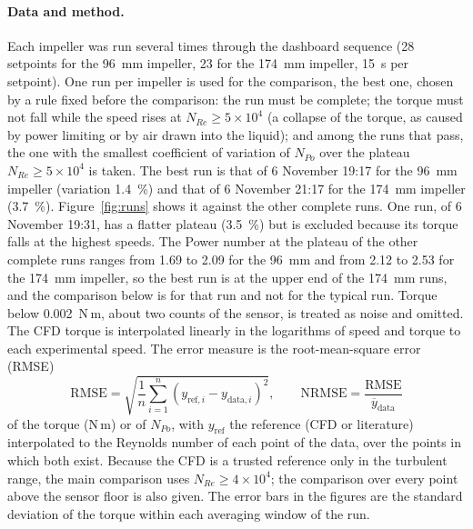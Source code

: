 \paragraph{Data and method.}
Each impeller was run several times through the dashboard sequence (28 setpoints for the 96~mm impeller, 23 for the 174~mm impeller, 15~s per setpoint). One run per impeller is used for the comparison, the best one, chosen by a rule fixed before the comparison: the run must be complete; the torque must not fall while the speed rises at $N_{Re} \geq 5\times10^{4}$ (a collapse of the torque, as caused by power limiting or by air drawn into the liquid); and among the runs that pass, the one with the smallest coefficient of variation of $N_{Po}$ over the plateau $N_{Re} \geq 5\times10^{4}$ is taken. The best run is that of 6 November 19:17 for the 96~mm impeller (variation 1.4~\%) and that of 6 November 21:17 for the 174~mm impeller (3.7~\%). Figure~\ref{fig:runs} shows it against the other complete runs. One run, of 6 November 19:31, has a flatter plateau (3.5~\%) but is excluded because its torque falls at the highest speeds. The Power number at the plateau of the other complete runs ranges from 1.69 to 2.09 for the 96~mm and from 2.12 to 2.53 for the 174~mm impeller, so the best run is at the upper end of the 174~mm runs, and the comparison below is for that run and not for the typical run. %
Torque below 0.002~N\,m, about two counts of the sensor, is treated as noise and omitted. The CFD torque is interpolated linearly in the logarithms of speed and torque to each experimental speed. The error measure is the root-mean-square error (RMSE)
\begin{equation}
    \mathrm{RMSE} = \sqrt{\frac{1}{n}\sum_{i=1}^{n}\left(y_{\mathrm{ref},i} - y_{\mathrm{data},i}\right)^{2}}, \qquad \mathrm{NRMSE} = \frac{\mathrm{RMSE}}{\overline{y}_{\mathrm{data}}}
    \label{eq:rmse}
\end{equation}
of the torque (N\,m) or of $N_{Po}$, with $y_{\mathrm{ref}}$ the reference (CFD or literature) interpolated to the Reynolds number of each point of the data, over the points in which both exist. Because the CFD is a trusted reference only in the turbulent range, the main comparison uses $N_{Re} \geq 4\times10^{4}$; the comparison over every point above the sensor floor is also given. The error bars in the figures are the standard deviation of the torque within each averaging window of the run.


